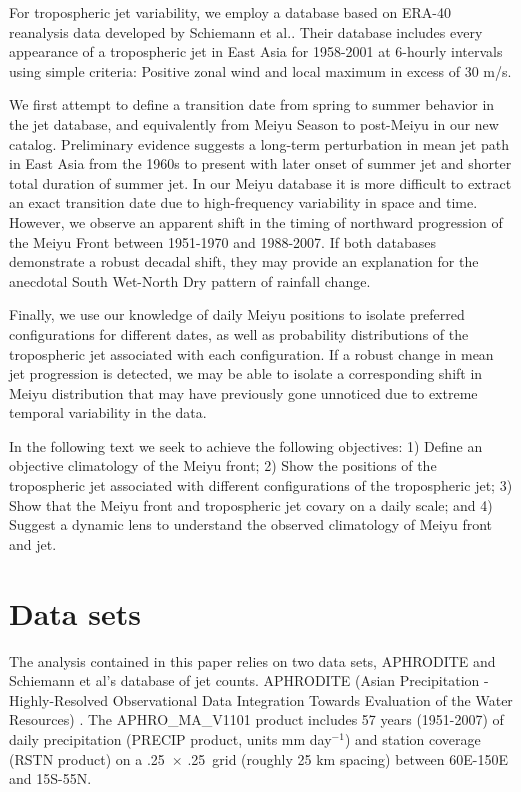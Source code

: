 \documentclass[draft,grl]{AGUTeX}
\begin{document}
\begin{article}
For tropospheric jet variability, we employ a database based on ERA-40 reanalysis data developed by Schiemann et al.\citet{Schiemann2009}. Their database includes every appearance of a tropospheric jet in East Asia for 1958-2001 at 6-hourly intervals using simple criteria: Positive zonal wind and local maximum in excess of 30 m/s.

	We first attempt to define a transition date from spring to summer behavior in the jet database, and equivalently from Meiyu Season to post-Meiyu in our new catalog. Preliminary evidence suggests a long-term perturbation in mean jet path in East Asia from the 1960s to present with later onset of summer jet and shorter total duration of summer jet. In our Meiyu database it is more difficult to extract an exact transition date due to high-frequency variability in space and time. However, we observe an apparent shift in the timing of northward progression of the Meiyu Front between 1951-1970 and 1988-2007. If both databases demonstrate a robust decadal shift, they may provide an explanation for the anecdotal South Wet-North Dry pattern of rainfall change.

	Finally, we use our knowledge of daily Meiyu positions to isolate preferred configurations for different dates, as well as probability distributions of the tropospheric jet associated with each configuration. If a robust change in mean jet progression is detected, we may be able to isolate a corresponding shift in Meiyu distribution that may have previously gone unnoticed due to extreme temporal variability in the data.

	In the following text we seek to achieve the following objectives: 1) Define an objective climatology of the Meiyu front; 2) Show the positions of the tropospheric jet associated with different configurations of the tropospheric jet; 3) Show that the Meiyu front and tropospheric jet covary on a daily scale; and 4) Suggest a dynamic lens to understand the observed climatology of Meiyu front and jet.
	
\section{Data sets}
The analysis contained in this paper relies on two data sets, APHRODITE and Schiemann et al's database of jet counts. APHRODITE (Asian Precipitation - Highly-Resolved Observational Data Integration Towards Evaluation of the Water Resources) \citep{Yatagai2012}. The APHRO\_MA\_V1101 product includes 57 years (1951-2007) of daily precipitation (PRECIP product, units mm day$^{-1}$) and station coverage (RSTN product) on a .25\textdegree\ $\times$ .25\textdegree\ grid (roughly 25 km spacing) between 60\textdegree E-150\textdegree E and 15\textdegree S-55\textdegree N.
	

\end{article}
\end{document}
